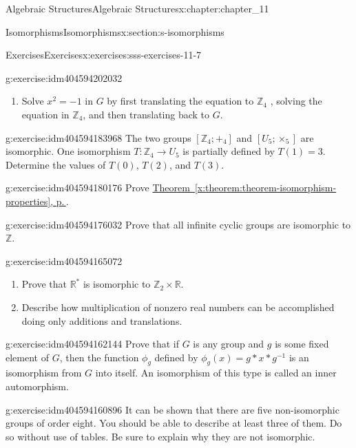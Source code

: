 \documentclass[twoside,10pt,]{book}
\newcommand{\xreffont}{\relax}
\numberwithin{equation}{section}
\begin{document}
\begin{chapterptx}{Algebraic Structures}{}{Algebraic Structures}{}{}{x:chapter:chapter_11}
\begin{sectionptx}{Isomorphisms}{}{Isomorphisms}{}{}{x:section:s-isomorphisms}
\begin{exercises-subsection}{Exercises}{}{Exercises}{}{}{x:exercises:sss-exercises-11-7}
\begin{divisionexercise}{4}{}{}{g:exercise:idm404594202032}
\begin{enumerate}[label=(\alph*)]
\item{}Solve \(x^2= -1\) in \(G\) by first translating the equation to \(\mathbb{Z}_4\) , solving the equation in \(\mathbb{Z}_4\), and then translating back to \(G\).%
\end{enumerate}
%
\end{divisionexercise}%
\begin{divisionexercise}{5}{}{}{g:exercise:idm404594183968}%
The two groups \(\left[\mathbb{Z}_4;+_4\right]\) and \(\left[U_5;\times _5\right]\) are isomorphic. One isomorphism \(T:\mathbb{Z}_4\to U_5\) is partially defined by \(T(1)=3\). Determine the values of \(T(0)\), \(T(2)\), and \(T(3)\).%
\end{divisionexercise}%
\begin{divisionexercise}{6}{}{}{g:exercise:idm404594180176}%
Prove \hyperref[x:theorem:theorem-isomorphism-properties]{Theorem~{\xreffont\ref{x:theorem:theorem-isomorphism-properties}}, p.\,\pageref{x:theorem:theorem-isomorphism-properties}}.%
\end{divisionexercise}%
\begin{divisionexercise}{7}{}{}{g:exercise:idm404594176032}%
Prove that all infinite cyclic groups are isomorphic to \(\mathbb{Z}\).%
\end{divisionexercise}%
\begin{divisionexercise}{8}{}{}{g:exercise:idm404594165072}%
%
\begin{enumerate}[label=(\alph*)]
\item{}Prove that \(\mathbb{R}^*\) is isomorphic to \(\mathbb{Z}_2 \times  \mathbb{R}\).%
\item{}Describe how multiplication of nonzero real numbers can be accomplished doing only additions and translations.%
\end{enumerate}
%
\end{divisionexercise}%
\begin{divisionexercise}{9}{}{}{g:exercise:idm404594162144}%
Prove that if \(G\) is any group and \(g\) is some fixed element of \(G\), then the function \(\phi _g\) defined by \(\phi_g(x) = g*x*g^{-1}\) is an isomorphism from \(G\) into itself.  An isomorphism of this type is called an inner automorphism.%
\end{divisionexercise}%
\begin{divisionexercise}{10}{}{}{g:exercise:idm404594160896}%
It can be shown that there are five non-isomorphic groups of order eight. You should be able to describe at least three of them. Do so without use of tables. Be sure to explain why they are not isomorphic.%
\end{divisionexercise}%
\end{exercises-subsection}
\end{sectionptx}
\end{chapterptx}
\end{document}
